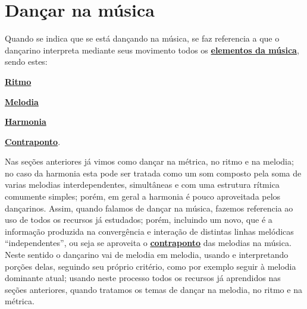 
\newpage
\section{Dançar na música}
\label{subsec:dancamusica}
Quando se indica que se está dançando na música, se faz referencia a que 
o dançarino interpreta mediante seus movimento todos os 
\hyperref[sec:elementosmusica]{\textbf{elementos da música}}, 
sendo estes:
\begin{inparaitem}
\item \hyperref[sec:pos:Ritmo]{\textbf{Ritmo}}
\item \hyperref[sec:pos:Melodia]{\textbf{Melodia}}
\item \hyperref[sec:pos:Harmonia]{\textbf{Harmonia}}
\item \hyperref[sec:pos:Contraponto]{\textbf{Contraponto}}.
\end{inparaitem}

Nas seções anteriores já vimos como dançar na métrica, no ritmo e na melodia;
no caso da harmonia esta pode ser tratada como um som composto 
pela soma de varias melodias interdependentes, simultâneas e com uma estrutura rítmica
comumente simples; porém, em geral a harmonia é pouco aproveitada pelos dançarinos.   
Assim, quando falamos de  dançar na música, fazemos referencia ao uso de todos os recursos já estudados;
porém, incluindo um novo, 
que é a informação produzida na convergência e interação de distintas linhas melódicas ``independentes'',
 ou seja se aproveita o 
\hyperref[sec:pos:Contraponto]{\textbf{contraponto}} das melodias na música. 
Neste sentido o dançarino vai de melodia em melodia, 
usando e interpretando porções delas, seguindo seu próprio critério,
como por exemplo seguir à melodia dominante atual;
usando neste processo todos os recursos já aprendidos nas seções anteriores, 
quando tratamos os temas de dançar 
na melodia, no ritmo e na métrica.

